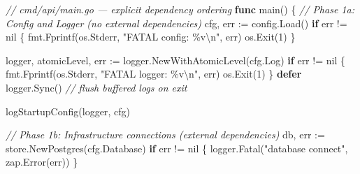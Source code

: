 \documentclass[
]{article}
\newenvironment{Shaded}{}{}
\newcommand{\CharTok}[1]{\textcolor[rgb]{0.25,0.44,0.63}{#1}}
\newcommand{\CommentTok}[1]{\textcolor[rgb]{0.38,0.63,0.69}{\textit{#1}}}
\newcommand{\ControlFlowTok}[1]{\textcolor[rgb]{0.00,0.44,0.13}{\textbf{#1}}}
\newcommand{\DecValTok}[1]{\textcolor[rgb]{0.25,0.63,0.44}{#1}}
\newcommand{\KeywordTok}[1]{\textcolor[rgb]{0.00,0.44,0.13}{\textbf{#1}}}
\newcommand{\NormalTok}[1]{#1}
\newcommand{\OperatorTok}[1]{\textcolor[rgb]{0.40,0.40,0.40}{#1}}
\newcommand{\OtherTok}[1]{\textcolor[rgb]{0.00,0.44,0.13}{#1}}
\newcommand{\StringTok}[1]{\textcolor[rgb]{0.25,0.44,0.63}{#1}}
\begin{document}
\begin{Shaded}
\begin{Highlighting}[]
\CommentTok{// cmd/api/main.go — explicit dependency ordering}
\KeywordTok{func}\NormalTok{ main}\OperatorTok{()} \OperatorTok{\{}
    \CommentTok{// Phase 1a: Config and Logger (no external dependencies)}
\NormalTok{    cfg}\OperatorTok{,}\NormalTok{ err }\OperatorTok{:=}\NormalTok{ config}\OperatorTok{.}\NormalTok{Load}\OperatorTok{()}
    \ControlFlowTok{if}\NormalTok{ err }\OperatorTok{!=} \OtherTok{nil} \OperatorTok{\{}
\NormalTok{        fmt}\OperatorTok{.}\NormalTok{Fprintf}\OperatorTok{(}\NormalTok{os}\OperatorTok{.}\NormalTok{Stderr}\OperatorTok{,} \StringTok{"FATAL config: \%v}\CharTok{\textbackslash{}n}\StringTok{"}\OperatorTok{,}\NormalTok{ err}\OperatorTok{)}
\NormalTok{        os}\OperatorTok{.}\NormalTok{Exit}\OperatorTok{(}\DecValTok{1}\OperatorTok{)}
    \OperatorTok{\}}

\NormalTok{    logger}\OperatorTok{,}\NormalTok{ atomicLevel}\OperatorTok{,}\NormalTok{ err }\OperatorTok{:=}\NormalTok{ logger}\OperatorTok{.}\NormalTok{NewWithAtomicLevel}\OperatorTok{(}\NormalTok{cfg}\OperatorTok{.}\NormalTok{Log}\OperatorTok{)}
    \ControlFlowTok{if}\NormalTok{ err }\OperatorTok{!=} \OtherTok{nil} \OperatorTok{\{}
\NormalTok{        fmt}\OperatorTok{.}\NormalTok{Fprintf}\OperatorTok{(}\NormalTok{os}\OperatorTok{.}\NormalTok{Stderr}\OperatorTok{,} \StringTok{"FATAL logger: \%v}\CharTok{\textbackslash{}n}\StringTok{"}\OperatorTok{,}\NormalTok{ err}\OperatorTok{)}
\NormalTok{        os}\OperatorTok{.}\NormalTok{Exit}\OperatorTok{(}\DecValTok{1}\OperatorTok{)}
    \OperatorTok{\}}
    \ControlFlowTok{defer}\NormalTok{ logger}\OperatorTok{.}\NormalTok{Sync}\OperatorTok{()} \CommentTok{// flush buffered logs on exit}

\NormalTok{    logStartupConfig}\OperatorTok{(}\NormalTok{logger}\OperatorTok{,}\NormalTok{ cfg}\OperatorTok{)}

    \CommentTok{// Phase 1b: Infrastructure connections (external dependencies)}
\NormalTok{    db}\OperatorTok{,}\NormalTok{ err }\OperatorTok{:=}\NormalTok{ store}\OperatorTok{.}\NormalTok{NewPostgres}\OperatorTok{(}\NormalTok{cfg}\OperatorTok{.}\NormalTok{Database}\OperatorTok{)}
    \ControlFlowTok{if}\NormalTok{ err }\OperatorTok{!=} \OtherTok{nil} \OperatorTok{\{}
\NormalTok{        logger}\OperatorTok{.}\NormalTok{Fatal}\OperatorTok{(}\StringTok{"database connect"}\OperatorTok{,}\NormalTok{ zap}\OperatorTok{.}\NormalTok{Error}\OperatorTok{(}\NormalTok{err}\OperatorTok{))}
    \OperatorTok{\}}


\end{Highlighting}
\end{Shaded}
\end{document}
